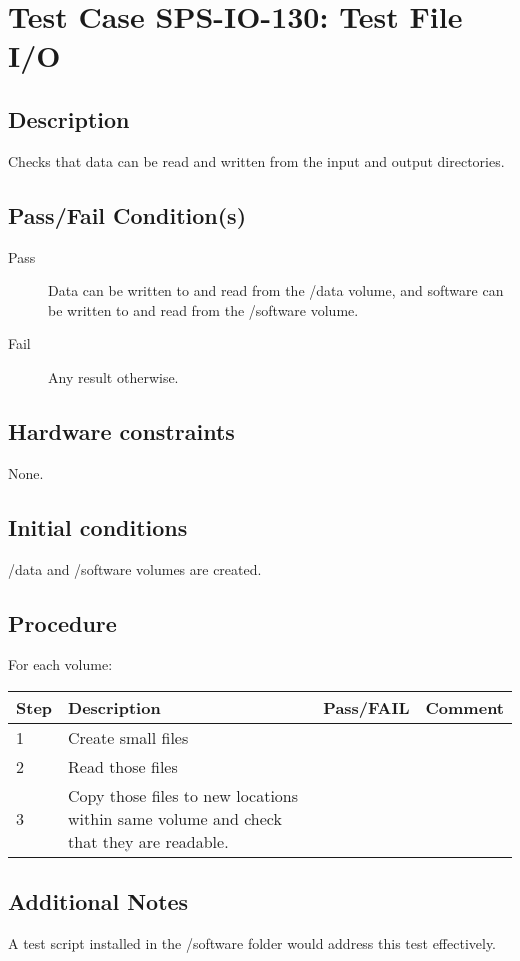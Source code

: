 \section{Test Case SPS-IO-130: Test File I/O}

\subsection{Description}

Checks that data can be read and written from the input and output directories.

\subsection{Pass/Fail Condition(s)}

\begin{description}
\item [Pass] Data can be written to and read from the /data volume,
and software can be written to and read from the /software volume.
\item [Fail] Any result otherwise.
\end{description}

\subsection{Hardware constraints}

None.

\subsection{Initial conditions}

/data and /software volumes are created.

\subsection{Procedure}

For each volume:

\begin{table}[H]
    \begin{tabular}{|l| p{5cm} |l| p{5cm} |}
    \hline
    {\bf Step} & {\bf Description} & {\bf Pass/FAIL} & {\bf Comment}  \\ \hline
    1 & Create small files &  &  \\ \hline
    2 & Read those files &  &  \\ \hline
    3 & Copy those files to new locations within same volume and check that they are readable. &  &  \\ \hline
    \end{tabular}
\end{table}


\subsection{Additional Notes}

A test script installed in the /software folder would address this test effectively.
